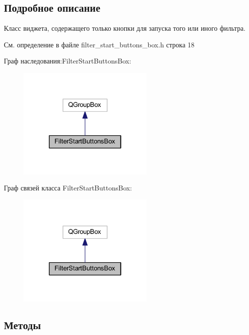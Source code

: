 \subsection{Подробное описание}
Класс виджета, содержащего только кнопки для запуска того или иного фильтра. 

См. определение в файле filter\+\_\+start\+\_\+buttons\+\_\+box.\+h строка 18



Граф наследования\+:Filter\+Start\+Buttons\+Box\+:
\nopagebreak
\begin{figure}[H]
\begin{center}
\leavevmode
\includegraphics[width=190pt]{class_filter_start_buttons_box__inherit__graph}
\end{center}
\end{figure}


Граф связей класса Filter\+Start\+Buttons\+Box\+:
\nopagebreak
\begin{figure}[H]
\begin{center}
\leavevmode
\includegraphics[width=190pt]{class_filter_start_buttons_box__coll__graph}
\end{center}
\end{figure}


\subsection{Методы}
\hypertarget{class_filter_start_buttons_box_ae3a208f9857ce99c02506e4005f71a60}{}\label{class_filter_start_buttons_box_ae3a208f9857ce99c02506e4005f71a60} 
